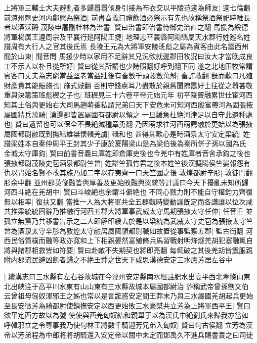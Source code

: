 上將軍三輔士大夫避亂者多歸囂囂傾身引接為布衣交以平陵范逡為師友|{
	逡七倫翻}
前涼州刺史河内鄭興為祭酒|{
	前書音義曰禮飲酒必祭示有先也故稱祭酒祭祀時唯長者以酒沃酹}
茂陵申屠剛杜林為治書|{
	賢曰治書即治書侍御史治直之翻}
馬援為綏德將軍楊廣王遵周宗及平襄行廵阿陽王捷|{
	地理志平襄縣阿陽縣屬天水郡行姓廵名姓譜周有大行人之官其後氏焉}
長陵王元為大將軍安陵班彪之屬為賓客由此名震西州聞於山東|{
	聞音問}
馬援少時以家用不足辭其兄況欲就邊郡田牧況曰汝大才當晚成良工不示人以朴且從所好|{
	賢曰從其所請也少詩照翻好呼到翻下同}
遂之北地田牧常謂賓客曰丈夫為志窮當益堅老當益壯後有畜數千頭穀數萬斛|{
	畜許救翻}
旣而歎曰凡殖財產貴其能賑施也|{
	施式䜴翻}
否則守錢虜耳乃盡散於親舊聞隗囂好士往從之囂甚敬重與決籌策班彪稺之子也|{
	班稺見三十六卷平帝元始元年}
初平陵竇融累世仕宦河西知其土俗與更始右大司馬趙萌善私謂兄弟曰天下安危未可知河西殷富帶河為固張掖屬國精兵萬騎|{
	漢邊郡皆置屬國有都尉以領之}
一旦緩急杜絶河津足以自守此遺種處也|{
	賢曰遺留也可以保全不畏絶滅種章勇翻}
乃因萌求往河西萌薦融於更始以為張掖屬國都尉融旣到撫結雄桀懷輯羌虜|{
	輯和也}
甚得其歡心是時酒泉太守安定梁統|{
	姓譜梁姓本自秦仲周平王封其少子康於夏陽梁山是為梁伯後為秦所併子孫以國為氏}
金城太守庫鈞|{
	賢曰前書音義曰庫姓即倉庫吏後也今羌中有姓庫者音舍承鈞之後也}
張掖都尉茂陵史苞酒泉都尉竺曾|{
	姓譜竺孤竹君之後本姓竺後漢擬陽侯竺晏報怨有仇以胄始名賢不改其族乃加二字以存夷齊一曰天竺國之後}
敦煌都尉辛肜|{
	敦徒門翻肜余中翻}
並州郡英俊融皆與厚善及更始敗融與梁統等計議曰今天下擾亂未知所歸河西斗絶在羌胡中|{
	賢曰斗峻絶也余謂斗僻絶也}
不同心戮力則不能自守權鈞力齊復無以相率|{
	復扶又翻}
當推一人為大將軍共全五郡觀時變動議旣定而各謙讓以位次咸共推梁統統固辭乃推融行河西五郡大將軍事武威太守馬期張掖太守任仲|{
	任音壬}
並孤立無黨乃共移書告示之二人即解印綬去於是以梁統為武威太守史苞為張掖太守竺曾為酒泉太守辛肜為敦煌太守融居屬國領都尉職如故置從事監察五郡|{
	監古衘翻}
河西民俗質樸而融等政亦寛和上下相親晏然富殖脩兵馬習戰射明烽燧羌胡犯塞融輒自將與諸郡相救皆如符要|{
	賢曰赴敵不失期契也將即亮翻}
每輒破之其後羌胡皆震服親附内郡流民避凶飢者歸之不絶王莽之世天下咸思漢德安定三水盧芳居左谷中

|{
	續漢志曰三水縣有左右谷故城在今涇州安定縣南水經註肥水出高平西北牽條山東北出峽注于高平川水東有山山東有三水縣故城本屬國都尉治}
詐稱武帝曾孫劉文伯云曾祖母匈奴渾邪王之姊也常以是言誑惑安定間王莽末乃與三水屬國羌胡起兵更始至長安徵芳為騎都尉使鎮撫安定以西更始敗三水豪桀共立芳為上將軍西平王|{
	賢曰欲平定西方故以為號}
使使與西羌匈奴結和親單于以為漢氏中絶劉氏來歸我亦當如呼韓邪立之令尊事我乃使句林王將數千騎迎芳兄弟入匈奴|{
	賢曰句古侯翻}
立芳為漢帝以芳弟程為中郎將將胡騎還入安定帝以關中未定而鄧禹久不進兵賜書責之曰司徒

